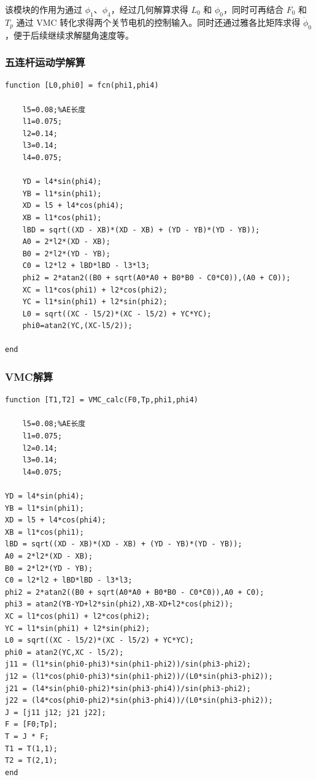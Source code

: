 该模块的作用为通过 $\phi_1$、$\phi_4$，经过几何解算求得 $L_0$ 和 $\phi_0$，同时可再结合 $F_0$ 和 $T_p$ 通过 VMC 转化求得两个关节电机的控制输入。同时还通过雅各比矩阵求得 $\dot{\phi}_0$，便于后续继续求解腿角速度等。

\subsubsection{五连杆运动学解算}

\FloatBarrier

\begin{verbatim}
function [L0,phi0] = fcn(phi1,phi4)
   
    l5=0.08;%AE长度
    l1=0.075;
    l2=0.14;
    l3=0.14;
    l4=0.075;
    
    YD = l4*sin(phi4);
    YB = l1*sin(phi1);
    XD = l5 + l4*cos(phi4);
    XB = l1*cos(phi1); 
    lBD = sqrt((XD - XB)*(XD - XB) + (YD - YB)*(YD - YB));
    A0 = 2*l2*(XD - XB);
    B0 = 2*l2*(YD - YB);
    C0 = l2*l2 + lBD*lBD - l3*l3;
    phi2 = 2*atan2((B0 + sqrt(A0*A0 + B0*B0 - C0*C0)),(A0 + C0));
    XC = l1*cos(phi1) + l2*cos(phi2);
    YC = l1*sin(phi1) + l2*sin(phi2);
    L0 = sqrt((XC - l5/2)*(XC - l5/2) + YC*YC);
    phi0=atan2(YC,(XC-l5/2));
    
end
\end{verbatim}

\subsubsection{VMC解算}

\begin{verbatim}
function [T1,T2] = VMC_calc(F0,Tp,phi1,phi4)

    l5=0.08;%AE长度
    l1=0.075;
    l2=0.14;
    l3=0.14;
    l4=0.075;

YD = l4*sin(phi4);
YB = l1*sin(phi1);
XD = l5 + l4*cos(phi4);
XB = l1*cos(phi1); 
lBD = sqrt((XD - XB)*(XD - XB) + (YD - YB)*(YD - YB));
A0 = 2*l2*(XD - XB);
B0 = 2*l2*(YD - YB);
C0 = l2*l2 + lBD*lBD - l3*l3;
phi2 = 2*atan2((B0 + sqrt(A0*A0 + B0*B0 - C0*C0)),A0 + C0);
phi3 = atan2(YB-YD+l2*sin(phi2),XB-XD+l2*cos(phi2));
XC = l1*cos(phi1) + l2*cos(phi2);
YC = l1*sin(phi1) + l2*sin(phi2);
L0 = sqrt((XC - l5/2)*(XC - l5/2) + YC*YC);
phi0 = atan2(YC,XC - l5/2);
j11 = (l1*sin(phi0-phi3)*sin(phi1-phi2))/sin(phi3-phi2);
j12 = (l1*cos(phi0-phi3)*sin(phi1-phi2))/(L0*sin(phi3-phi2));
j21 = (l4*sin(phi0-phi2)*sin(phi3-phi4))/sin(phi3-phi2);
j22 = (l4*cos(phi0-phi2)*sin(phi3-phi4))/(L0*sin(phi3-phi2));
J = [j11 j12; j21 j22];
F = [F0;Tp];
T = J * F;
T1 = T(1,1);
T2 = T(2,1);
end
\end{verbatim}

